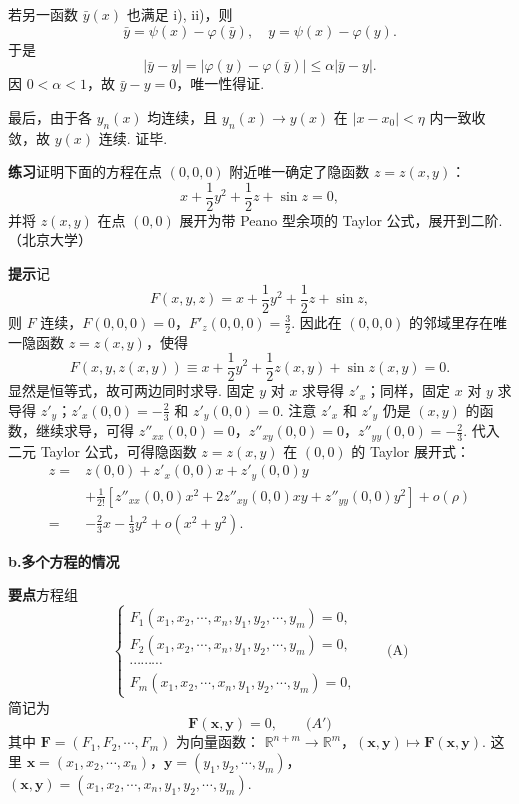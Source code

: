 \documentclass[UTF8, 12pt, fontset=fandol, oneside]{ctexart}
\begin{document}
若另一函数 $\bar y(x)$ 也满足 i), ii)，则
\[
  \bar y=\psi(x)-\varphi(\bar y),\quad
  y=\psi(x)-\varphi(y).
\]
于是
\[
  |\bar y-y|=|\varphi(y)-\varphi(\bar y)|
  \le\alpha|\bar y-y|.
\]
因 $0<\alpha<1$，故 $\bar y-y=0$，唯一性得证.

最后，由于各 $y_n(x)$ 均连续，且 $y_n(x)\to y(x)$ 在 $|x-x_0|<\eta$ 内一致收敛，故 $y(x)$ 连续. 证毕.

\noindent\textbf{练习}\quad 证明下面的方程在点 $(0,0,0)$ 附近唯一确定了隐函数 $z=z(x,y)$：
\[
  x+\frac12 y^2+\frac12 z+\sin z=0,
\]
并将 $z(x,y)$ 在点 $(0,0)$ 展开为带 Peano 型余项的 Taylor 公式，展开到二阶.（北京大学）

\noindent\textbf{提示}\quad 记
\[
  F(x,y,z)=x+\frac12 y^2+\frac12 z+\sin z,
\]
则 $F$ 连续，$F(0,0,0)=0$，$F'_z(0,0,0)=\frac32$. 因此在 $(0,0,0)$ 的邻域里存在唯一隐函数 $z=z(x,y)$，使得
\[
  F(x,y,z(x,y))\equiv
  x+\frac12 y^2+\frac12 z(x,y)+\sin z(x,y)=0.
\]
显然是恒等式，故可两边同时求导. 固定 $y$ 对 $x$ 求导得 $z'_x$；同样，固定 $x$ 对 $y$ 求导得 $z'_y$；$z'_x(0,0)=-\frac23$ 和 $z'_y(0,0)=0$. 注意 $z'_x$ 和 $z'_y$ 仍是 $(x,y)$ 的函数，继续求导，可得 $z''_{xx}(0,0)=0$，$z''_{xy}(0,0)=0$，$z''_{yy}(0,0)=-\frac23$. 代入二元 Taylor 公式，可得隐函数 $z=z(x,y)$ 在 $(0,0)$ 的 Taylor 展开式：
\[
\begin{aligned}
  z={}&z(0,0)+z'_x(0,0)x+z'_y(0,0)y  \\
  &+\frac1{2!}\left[z''_{xx}(0,0)x^2+2z''_{xy}(0,0)xy+z''_{yy}(0,0)y^2\right]+o(\rho) \\
  ={}&-\frac23x-\frac13y^2+o(x^2+y^2).
\end{aligned}
\]

\noindent\textbf{b.\quad 多个方程的情况}

\noindent\textbf{要点}\quad 方程组
\[
\begin{cases}
  F_1(x_1,x_2,\cdots,x_n,y_1,y_2,\cdots,y_m)=0,\\
  F_2(x_1,x_2,\cdots,x_n,y_1,y_2,\cdots,y_m)=0,\\
  \cdots\cdots\cdots\\
  F_m(x_1,x_2,\cdots,x_n,y_1,y_2,\cdots,y_m)=0,
\end{cases}\qquad\text{(A)}
\]
简记为
\[
  \mathbf F(\mathbf x,\mathbf y)=0,\qquad\text{($A'$)}
\]
其中 $\mathbf F=(F_1,F_2,\cdots,F_m)$ 为向量函数：
$\mathbb R^{n+m}\to\mathbb R^m$，$(\mathbf x,\mathbf y)\mapsto
\mathbf F(\mathbf x,\mathbf y)$. 这里
$\mathbf x=(x_1,x_2,\cdots,x_n)$，$\mathbf y=(y_1,y_2,\cdots,y_m)$，
$(\mathbf x,\mathbf y)=(x_1,x_2,\cdots,x_n,y_1,y_2,\cdots,y_m)$.
\end{document}
